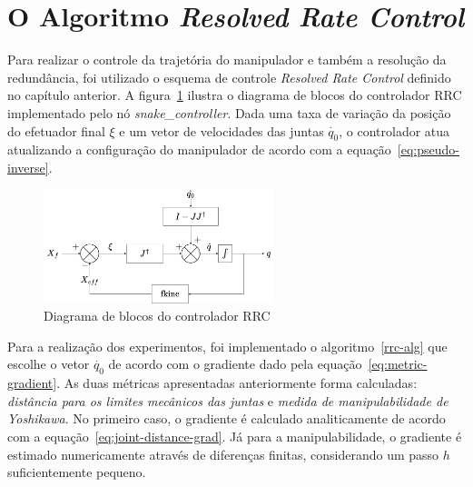 \section{O Algoritmo \emph{Resolved Rate Control}}

Para realizar o controle da trajetória do manipulador e também a resolução da
redundância, foi utilizado o esquema de controle \emph{Resolved Rate Control}
definido no capítulo anterior. A figura~\ref{fig:block-diagram} ilustra o
diagrama de blocos do controlador RRC implementado pelo nó
\emph{snake\_controller}. Dada uma taxa de variação da posição do efetuador
final \(\xi\) e um vetor de velocidades das juntas \(\dot{q_0}\), o controlador
atua atualizando a configuração do manipulador de acordo com a
equação~\ref{eq:pseudo-inverse}.

\begin{figure}
    \centering
    \includegraphics[width=0.6\textwidth]{./Images/control-scheme.png}
    \caption{Diagrama de blocos do controlador RRC}\label{fig:block-diagram}
\end{figure}

Para a realização dos experimentos, foi implementado o algoritmo~\ref{rrc-alg}
que escolhe o vetor \(\dot{q_0}\) de acordo com o gradiente dado pela
equação~\ref{eq:metric-gradient}. As duas métricas apresentadas anteriormente
forma calculadas: \emph{distância para os limites mecânicos das juntas} e
\emph{medida de manipulabilidade de Yoshikawa}. No primeiro caso, o gradiente é
calculado analiticamente de acordo com a equação~\ref{eq:joint-distance-grad}.
Já para a manipulabilidade, o gradiente é estimado numericamente através de
diferenças finitas, considerando um passo \(h\) suficientemente pequeno.

